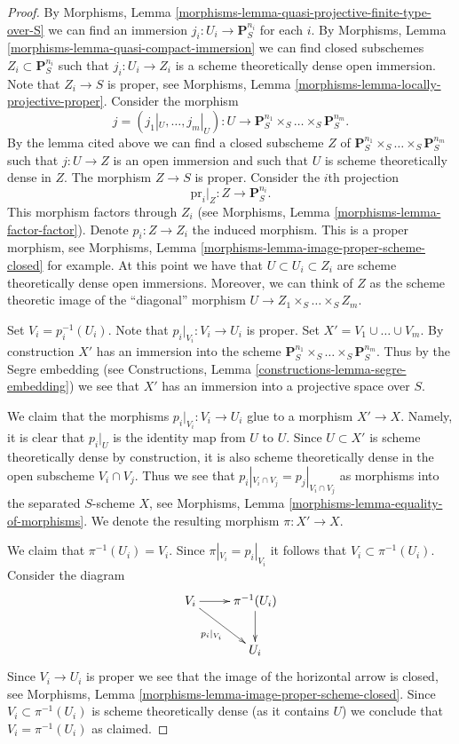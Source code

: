 \documentclass{stacks-project}
\theoremstyle{plain}
\theoremstyle{definition}
\theoremstyle{remark}
\numberwithin{equation}{subsection}
\begin{document}
\begin{proof}
\medskip\noindent
By Morphisms, Lemma \ref{morphisms-lemma-quasi-projective-finite-type-over-S}
we can find an immersion $j_i : U_i \to \mathbf{P}_S^{n_i}$
for each $i$. By
Morphisms, Lemma \ref{morphisms-lemma-quasi-compact-immersion} we can find
closed subschemes $Z_i \subset \mathbf{P}_S^{n_i}$
such that $j_i : U_i \to Z_i$ is a scheme theoretically
dense open immersion. Note that $Z_i \to S$ is proper, see
Morphisms, Lemma \ref{morphisms-lemma-locally-projective-proper}.
Consider the morphism
$$
j = (j_1|_U, \ldots, j_m|_U) : U \longrightarrow
\mathbf{P}_S^{n_1} \times_S \ldots \times_S \mathbf{P}_S^{n_m}.
$$
By the lemma cited above we can find a closed subscheme
$Z$ of $\mathbf{P}_S^{n_1} \times_S \ldots \times_S \mathbf{P}_S^{n_m}$
such that $j : U \to Z$ is an open immersion and such that $U$
is scheme theoretically dense in $Z$. The morphism $Z \to S$
is proper. Consider the $i$th projection
$$
\text{pr}_i|_Z : Z \longrightarrow \mathbf{P}^{n_i}_S.
$$
This morphism factors through $Z_i$ (see Morphisms,
Lemma \ref{morphisms-lemma-factor-factor}). Denote $p_i : Z \to Z_i$
the induced morphism. This is a proper morphism, see
Morphisms, Lemma \ref{morphisms-lemma-image-proper-scheme-closed}
for example. At this point we have that
$U \subset U_i \subset Z_i$ are scheme theoretically
dense open immersions. Moreover, we can think of $Z$ as the
scheme theoretic image of the ``diagonal'' morphism
$U \to Z_1 \times_S \ldots \times_S Z_m$.

\medskip\noindent
Set $V_i = p_i^{-1}(U_i)$. Note that $p_i|_{V_i} : V_i \to U_i$ is proper.
Set $X' = V_1 \cup \ldots \cup V_m$. By construction $X'$ has an immersion
into the scheme
$\mathbf{P}^{n_1}_S \times_S \ldots \times_S \mathbf{P}^{n_m}_S$.
Thus by the Segre embedding (see
Constructions, Lemma \ref{constructions-lemma-segre-embedding})
we see that $X'$ has
an immersion into a projective space over $S$.

\medskip\noindent
We claim that the morphisms $p_i|_{V_i}: V_i \to U_i$ glue to a morphism
$X' \to X$. Namely, it is clear that $p_i|_U$ is the identity map
from $U$ to $U$. Since $U \subset X'$ is scheme theoretically
dense by construction, it is also scheme theoretically dense
in the open subscheme $V_i \cap V_j$. Thus we see that
$p_i|_{V_i \cap V_j} = p_j|_{V_i \cap V_j}$ as morphisms into the
separated $S$-scheme $X$, see
Morphisms, Lemma \ref{morphisms-lemma-equality-of-morphisms}.
We denote the resulting morphism $\pi : X' \to X$.

\medskip\noindent
We claim that $\pi^{-1}(U_i) = V_i$.
Since $\pi|_{V_i} = p_i|_{V_i}$ it follows that
$V_i \subset \pi^{-1}(U_i)$. Consider the diagram
$$
\xymatrix{
V_i \ar[r] \ar[rd]_{p_i|_{V_i}} & \pi^{-1}(U_i) \ar[d] \\
& U_i
}
$$
Since $V_i \to U_i$ is proper we see that the image of
the horizontal arrow is closed, see
Morphisms, Lemma \ref{morphisms-lemma-image-proper-scheme-closed}.
Since $V_i \subset \pi^{-1}(U_i)$ is scheme
theoretically dense (as it contains $U$)
we conclude that $V_i = \pi^{-1}(U_i)$ as claimed.


\end{proof}
\end{document}
